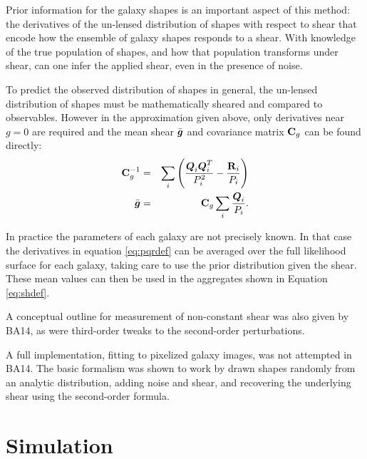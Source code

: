 \documentclass[12pt,preprint]{aastex}
\newcommand{\vecg}{\mbox{\boldmath $g$}}
\newcommand{\vecD}{\mbox{\boldmath $D$}}
\newcommand{\vecQ}{\mbox{\boldmath $Q$}}
\newcommand{\matR}{\mbox{$\bf R$}}
\newcommand{\matC}{\mbox{$\bf C$}}
\newcommand{\bnabg}{ \boldsymbol{\nabla_g}}
\begin{document}
Prior information for the galaxy shapes is an important aspect of this method:
the derivatives of the un-lensed distribution of shapes with respect to shear
that encode how the ensemble of galaxy shapes responds to a shear. With
knowledge of the true population of shapes, and how that population transforms
under shear, can one infer the applied shear, even in the presence of noise.

To predict the observed distribution of shapes in general, the un-lensed
distribution of shapes must be mathematically sheared and compared to
observables.  However in the approximation given above, only derivatives near
$g=0$ are required and the mean shear $\bar{\vecg}$ and covariance matrix
$\matC_g$ can be found directly:
\begin{eqnarray}
\matC_g^{-1} & = & \sum_i \left(\frac{\vecQ_i \vecQ^T_i}{P_i^2} - \frac{\matR_i}{P_i}\right) \label{eq:cdef} \\
\bar{\vecg} & = &  \matC_g \sum_i \frac{\vecQ_i}{P_i}. \label{eq:shdef}
\end{eqnarray}

In practice the parameters of each galaxy are not precisely known. In that case
the derivatives in equation \ref{eq:pqrdef} can be averaged over the full
likelihood surface for each galaxy, taking care to use the prior
distribution given the shear.  These mean values can then be used in the
aggregates shown in Equation \ref{eq:shdef}.

A conceptual outline for measurement of non-constant shear was also given by
BA14, as were third-order tweaks to the second-order perturbations.

A full implementation, fitting to pixelized galaxy images, was not attempted in
BA14.  The basic formalism was shown to work by drawn shapes randomly from
an analytic distribution, adding noise and shear, and recovering the underlying
shear using the second-order formula.

\section{Simulation} \label{sec:sim}
\end{document}

